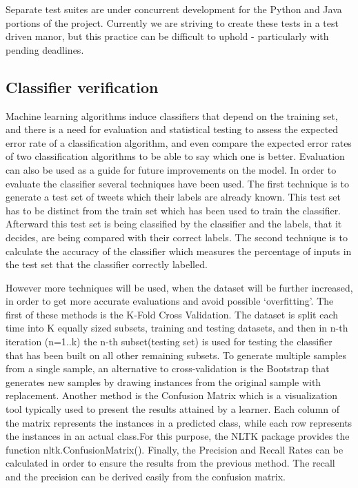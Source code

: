 Separate test suites are under concurrent development for the Python and Java
portions of the project. Currently we are striving to create these tests in a
test driven manor, but this practice can be difficult to uphold - particularly
with pending deadlines.

\subsection{Classifier verification}
Machine learning algorithms induce classifiers that depend on the training set,
and there is a need for evaluation and statistical testing to assess the
expected error rate of a classification algorithm, and even compare the
expected error rates of two classification algorithms to be able to say which
one is better. Evaluation can also be used as a guide for future improvements
on the model. In order to evaluate the classifier several techniques have been
used. The first technique is to generate a test set of tweets which their
labels are already known. This test set has to be distinct from the train set
which has been used to train the classifier. Afterward this test set is being
classified by the classifier and the labels, that it decides, are being
compared with their correct labels. The second technique is to calculate the
accuracy of the classifier which measures the percentage of inputs in the test
set that the classifier correctly labelled.

However more techniques will be used, when the dataset will be further
increased, in order to get more accurate evaluations and avoid possible
`overfitting'. The first of these methods is the K-Fold Cross Validation. The
dataset is split each time into K equally sized subsets, training and testing
datasets, and then in n-th iteration (n=1..k) the n-th subset(testing set) is
used for testing the classifier that has been built on all other remaining
subsets. To generate multiple samples from a single sample, an alternative to
cross-validation is the Bootstrap that generates new samples by drawing
instances from the original sample with replacement. Another method is the
Confusion Matrix which is a visualization tool typically used to present the
results attained by a learner. Each column of the matrix represents the
instances in a predicted class, while each row represents the instances in an
actual class.For this purpose, the NLTK package provides the function
nltk.ConfusionMatrix(). Finally, the Precision and Recall Rates can be
calculated in order to ensure the results from the previous method. The recall
and the precision can be derived easily from the confusion matrix.
